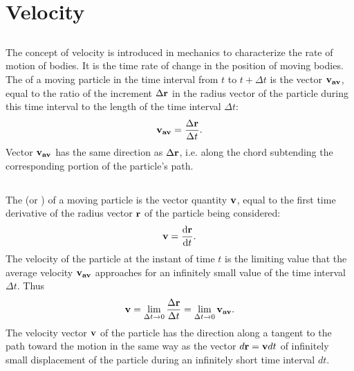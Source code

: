 \section{Velocity}
\label{sec-1.3}

\subsection{}\label{1.3.1} The concept of velocity is introduced in mechanics to characterize the rate of motion of bodies. It is the time rate of change in the position of moving bodies. The  of a moving particle in the time interval from $t$ to $t + \Delta t$ is the vector $\vb{v_{av}}$, equal to the ratio of the increment $\Delta \vb{r}$ in the radius vector of the particle during this time interval to the length of the time interval $\Delta t$:
\begin{equation*}%
\vb{v_{av}} = \frac{\Delta \vb{r}}{\Delta t}.
\end{equation*}
Vector $\vb{v_{av}}$ has the same direction as $\Delta \vb{r}$, i.e. along the chord subtending the corresponding portion of the particle's path. 

\subsection{}\label{1.3.2} The  (or ) of a moving particle is the vector quantity $\vb{v}$, equal to the first time derivative of the radius vector $\vb{r}$ of the particle being considered:
\begin{equation*}%
\vb{v} = \dv{\vb{r}}{t}.
\end{equation*}
The velocity of the particle at the instant of time $t$ is the lim­iting value that the average velocity $\vb{v_{av}}$ approaches for an infinitely small value of the time interval $\Delta t$. Thus
\begin{equation*}%
\vb{v} = \lim_{\Delta t \to 0}\frac{\Delta \vb{r}}{\Delta t} = \lim_{\Delta t \to 0}\vb{v_{av}}.
\end{equation*}
The velocity vector $\vb{v}$ of the particle has the direction along a tangent to the path toward the motion in the same way as the vector $d\vb{r} = \vb{v} dt$ of infinitely small displacement of the particle during an infinitely short time interval $dt$.

